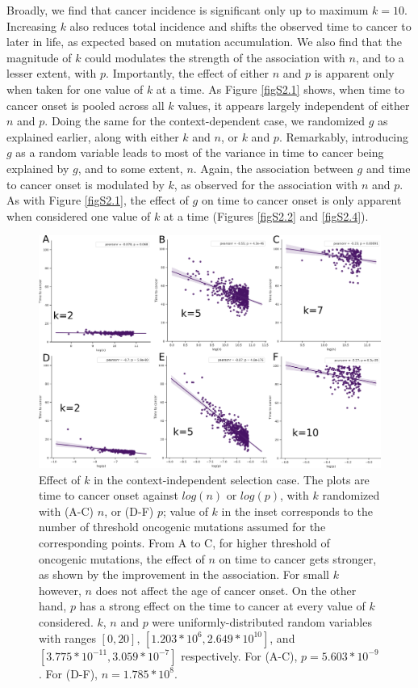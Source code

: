 \documentclass[10pt,twocolumn,twoside]{article}
\begin{document}
		Broadly, we find that cancer incidence is significant only up to maximum $k=10$. Increasing $k$ also reduces total incidence and shifts the observed time to cancer to later in life, as expected based on mutation accumulation. We also find that the magnitude of $k$ could modulates the strength of the association with $n$, and to a lesser extent, with $p$. Importantly, the effect of either $n$ and $p$ is apparent only when taken for one value of $k$ at a time. As Figure \ref{figS2.1} shows, when time to cancer onset is pooled across all $k$ values, it appears largely independent of either $n$ and $p$.
		Doing the same for the context-dependent case, we randomized $g$ as explained earlier, along with either $k$ and $n$, or $k$ and $p$. Remarkably, introducing $g$ as a random variable leads to most of the variance in time to cancer being explained by $g$, and to some extent, $n$. Again, the association between $g$ and time to cancer onset is modulated by $k$, as observed for the association with $n$ and $p$. As with Figure \ref{figS2.1}, the effect of $g$ on time to cancer onset is only apparent when considered one value of $k$ at a time (Figures \ref{figS2.2} and \ref{figS2.4}).

		\begin{figure}[tbhp]
			\centering
			\includegraphics[width=\linewidth, keepaspectratio=true]{figS2-3.png}
			\caption{Effect of $k$ in the context-independent selection case. The plots are time to cancer onset against $log(n)$ or $log(p)$, with $k$ randomized with (A-C) $n$, or (D-F) $p$; value of $k$ in the inset corresponds to the number of threshold oncogenic mutations assumed for the corresponding points. From A to C, for higher threshold of oncogenic mutations, the effect of $n$ on time to cancer gets stronger, as shown by the improvement in the association. For small $k$ however, $n$ does not affect the age of cancer onset. On the other hand, $p$ has a strong effect on the time to cancer at every value of $k$ considered. $k$, $n$ and $p$ were uniformly-distributed random variables with ranges $[0, 20]$, $[1.203*10^{6}, 2.649*10^{10}]$, and $[3.775*10^{-11}, 3.059*10^{-7}]$ respectively. For (A-C), $p=5.603*10^{-9}$. For (D-F), $n=1.785*10^{8}$.}
			\label{figS2.3}
		\end{figure}
\end{document}
